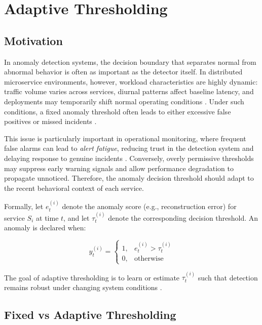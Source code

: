 \chapter{Adaptive Thresholding}
\label{ch:adaptive_thresholding}

\section{Motivation}
\label{sec:threshold_motivation}

In anomaly detection systems, the decision boundary that separates normal from 
abnormal behavior is often as important as the detector itself. In distributed 
microservice environments, however, workload characteristics are highly dynamic: 
traffic volume varies across services, diurnal patterns affect baseline latency, 
and deployments may temporarily shift normal operating conditions \cite{turn0search8}. 
Under such conditions, a fixed anomaly threshold often leads to either excessive false 
positives or missed incidents \cite{turn0search8}.

This issue is particularly important in operational monitoring, where frequent 
false alarms can lead to \emph{alert fatigue}, reducing trust in the detection 
system and delaying response to genuine incidents \cite{turn0search8}. Conversely, 
overly permissive thresholds may suppress early warning signals and allow 
performance degradation to propagate unnoticed. Therefore, the anomaly decision 
threshold should adapt to the recent behavioral context of each service.

Formally, let $e_t^{(i)}$ denote the anomaly score (e.g., reconstruction error) 
for service $S_i$ at time $t$, and let $\tau_t^{(i)}$ denote the corresponding 
decision threshold. An anomaly is declared when:

\[
y_t^{(i)} =
\begin{cases}
1, & e_t^{(i)} > \tau_t^{(i)} \\
0, & \text{otherwise}
\end{cases}
\]

The goal of adaptive thresholding is to learn or estimate $\tau_t^{(i)}$ such 
that detection remains robust under changing system conditions \cite{turn0search1}.

\section{Fixed vs Adaptive Thresholding}
\label{sec:threshold_fixed_vs_adaptive}

